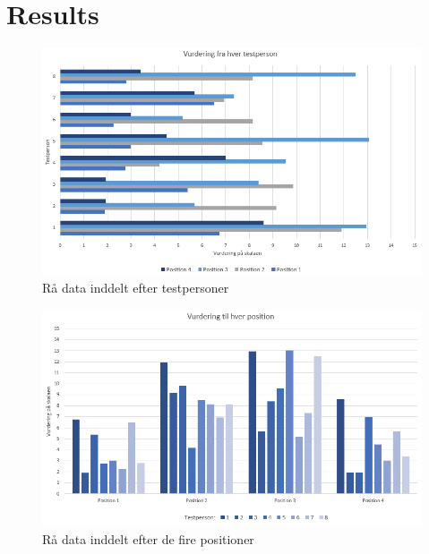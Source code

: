 \section*{Results}
\label{Results}
%
\begin{figure}[H]
\centering
\includegraphics[width = \textwidth]{Figure/RaaDataTestpersoner.PNG} 
\caption{Rå data inddelt efter testpersoner}
\label{fig:RaaDataTestpersoner}
\end{figure}
%

%
\begin{figure}[H]
\centering
\includegraphics[width = \textwidth]{Figure/RaaDataPositioner.PNG} 
\caption{Rå data inddelt efter de fire positioner}
\label{fig:RaaDataPositioner}
\end{figure}
%
